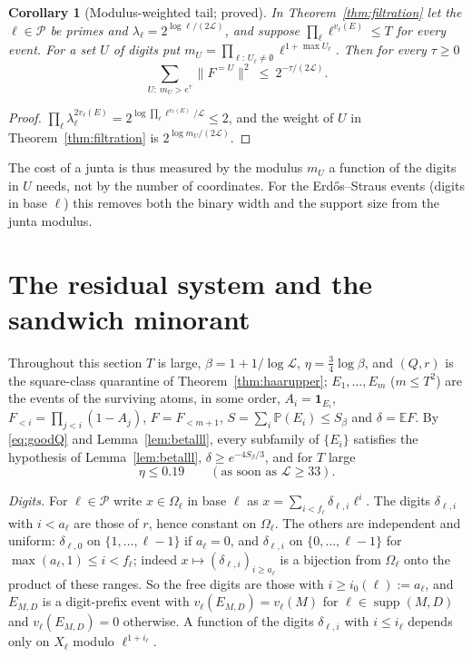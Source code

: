 \documentclass[11pt,reqno]{amsart}
\newtheorem{corollary}[theorem]{Corollary}
\theoremstyle{definition}
\newcommand{\cP}{\mathcal P}
\newcommand{\Lc}{\mathcal L}
\newcommand{\E}{\mathbb E}
\newcommand{\PP}{\mathbb P}
\newcommand{\supp}{\operatorname{supp}}
\begin{document}
\begin{corollary}[Modulus-weighted tail; proved]\label{cor:modtail}
In Theorem~\ref{thm:filtration} let the $\ell\in\cP$ be primes and
$\lambda_\ell=2^{\log\ell/(2\Lc)}$, and suppose $\prod_\ell\ell^{v_\ell(E)}\le T$ for every
event.  For a set $U$ of digits put $m_U=\prod_{\ell:\,U_\ell\ne\emptyset}\ell^{1+\max U_\ell}$.
Then for every $\tau\ge0$
\[
 \sum_{U:\ m_U>e^\tau}\|F^{=U}\|^2\ \le\ 2^{-\tau/(2\Lc)} .
\]
\end{corollary}

\begin{proof}
$\prod_\ell\lambda_\ell^{2v_\ell(E)}=2^{\log\prod_\ell\ell^{v_\ell(E)}/\Lc}\le2$, and the weight of $U$
in Theorem~\ref{thm:filtration} is $2^{\log m_U/(2\Lc)}$.
\end{proof}

The cost of a junta is thus measured by the modulus $m_U$ a function of the
digits in $U$ needs, not by the number of coordinates.  For the
Erd\H{o}s--Straus events (digits in base $\ell$) this removes both the
binary width and the support size from the junta modulus.

\section{The residual system and the sandwich minorant}\label{sec:brw}

Throughout this section $T$ is large, $\beta=1+1/\log\Lc$, $\eta=\frac34\log\beta$,
and $(Q,r)$ is the square-class quarantine of Theorem~\ref{thm:haarupper};
$E_1,\dots,E_m$ ($m\le T^2$) are the events of the surviving atoms, in some
order, $A_i=\mathbf 1_{E_i}$, $F_{<i}=\prod_{j<i}(1-A_j)$, $F=F_{<m+1}$,
$S=\sum_i\PP(E_i)\le S_\beta$ and $\delta=\E F$.  By \eqref{eq:goodQ} and
Lemma~\ref{lem:betalll}, every subfamily of $\{E_i\}$ satisfies the hypothesis
of Lemma~\ref{lem:betalll}, $\delta\ge e^{-4S_\beta/3}$, and for $T$ large
\begin{equation}\label{eq:lllhyp}
 \eta\le0.19\qquad(\text{as soon as }\Lc\ge33).
\end{equation}

\emph{Digits.}  For $\ell\in\cP$ write $x\in\Omega_\ell$ in base $\ell$ as
$x=\sum_{i<f_\ell}\delta_{\ell,i}\ell^i$.  The digits $\delta_{\ell,i}$ with $i<a_\ell$ are those of
$r$, hence constant on $\Omega_\ell$.  The others are independent and uniform:
$\delta_{\ell,0}$ on $\{1,\dots,\ell-1\}$ if $a_\ell=0$, and $\delta_{\ell,i}$ on $\{0,\dots,\ell-1\}$
for $\max(a_\ell,1)\le i<f_\ell$; indeed $x\mapsto(\delta_{\ell,i})_{i\ge a_\ell}$ is a bijection
from $\Omega_\ell$ onto the product of these ranges.  So the free digits are
those with $i\ge i_0(\ell):=a_\ell$, and $E_{M,D}$ is a digit-prefix event with
$v_\ell(E_{M,D})=v_\ell(M)$ for $\ell\in\supp(M,D)$ and $v_\ell(E_{M,D})=0$ otherwise.  A
function of the digits $\delta_{\ell,i}$ with $i\le i_\ell$ depends only on $X_\ell$ modulo
$\ell^{1+i_\ell}$.
\end{document}

